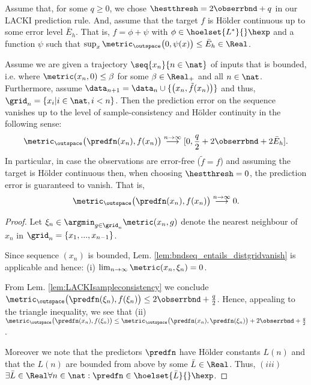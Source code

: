 \begin{thm}
Assume that, for some $q\geq0$, we chose $\hestthresh = 2 \obserrbnd + q$ in our LACKI prediction rule. And, assume that the target $f$ is H\"older continuous up to some error level $\bar E_h$. That is, $f = \phi + \psi$ with $\phi \in \hoelset {L^*} { } \hexp$ and a function $\psi$ such that $\sup_x \metric_\outspace\bigl(0,\psi(x)\bigr) \leq \bar E_h \in \Real$.

Assume we are given a trajectory $\seq{x_n}{n \in \nat}$ of inputs that is bounded, i.e. where 
$\metric(x_n,0) \leq \beta$ for some $\beta \in \Real_+$ and all $n \in \nat$.
Furthermore, assume $\data_{n+1} = \data_n \cup \{ \bigl(x_n, \tilde f(x_n)\bigr) \}$ and thus, $\grid_n = \{ x_i | i \in \nat, i < n\}$.
Then the prediction error on the sequence vanishes up to the level of sample-consistency and H\"older continuity in the following sense:
 \[\metric_\outspace\bigl(\predfn(x_n),f(x_n) \bigr) \stackrel{n \to \infty}{\longrightarrow} [0,\frac q 2 + 2  \obserrbnd  + 2 \bar E_h].\]
In particular, in case the observations are error-free ($\tilde f = f$) and assuming the target is H\"older continuous then, when choosing $\hestthresh = 0$, the prediction error is guaranteed to vanish. That is,
\[\metric_\outspace\bigl(\predfn(x_n),f(x_n) \bigr) \stackrel{n \to \infty}{\longrightarrow}0.\]

\begin{proof}

Let $\xi_n  \in \argmin_{g \in \grid_n} \metric(x_n,g)$ denote the nearest neighbour of $x_n$ in $\grid_n = \{x_1,...,x_{n-1}\}$.

Since sequence $(x_n)$ is bounded, Lem. \ref{lem:bndseq_entails_distgridvanish} is applicable and hence: (i) $\lim_{n \to \infty} \metric (x_n,\xi_n) = 0$.

From Lem. \ref{lem:LACKIsampleconsistency} we conclude 
$\metric_\outspace\bigl(\predfn(\xi_n) ,  f(\xi_n)  \bigr) \leq 2\obserrbnd +  \frac q 2$. Hence, appealing to the triangle inequality, we see that 
(ii) $\metric_\outspace\bigl(\predfn(x_n) ,  f(\xi_n)  \bigr) \leq \metric_\outspace\bigl(\predfn(x_n) ,  \predfn(\xi_n) \bigr) + 2 \obserrbnd + \frac q 2$.



Moreover we note that the predictors $\predfn$ have H\"older constants $L(n)$ and that the $L(n)$ are bounded from above by some $\bar L \in \Real$. Thus,  $(iii)$ $\exists \bar L \in \Real\forall n \in \nat : \predfn \in \hoelset {\bar L} { } \hexp$. 
  

\end{proof}
\end{thm}
